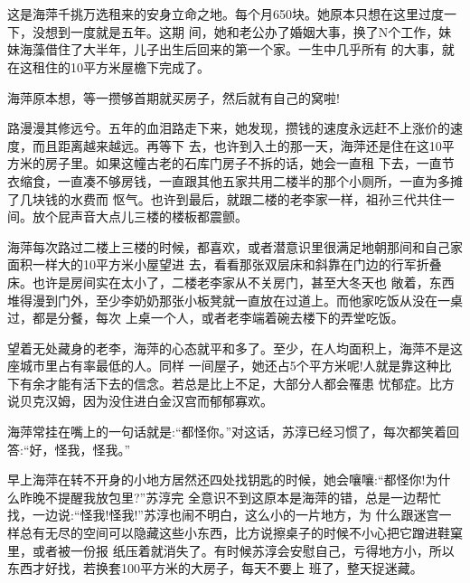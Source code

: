 \documentclass[11pt,a4paper,onecolumn]{article}
\begin{document}
\setcounter{section}{0}
\pagestyle{fancy}

\begin{center}
\end{center}

\section[\thesection]{}

这是海萍千挑万选租来的安身立命之地。每个月650块。她原本只想在这里过度一下，没想到一度就是五年。这期
间，她和老公办了婚姻大事，换了N个工作，妹妹海藻借住了大半年，儿子出生后回来的第一个家。一生中几乎所有
的大事，就在这租住的10平方米屋檐下完成了。

海萍原本想，等一攒够首期就买房子，然后就有自己的窝啦!

路漫漫其修远兮。五年的血泪路走下来，她发现，攒钱的速度永远赶不上涨价的速度，而且距离越来越远。再等下
去，也许到入土的那一天，海萍还是住在这10平方米的房子里。如果这幢古老的石库门房子不拆的话，她会一直租
下去，一直节衣缩食，一直凑不够房钱，一直跟其他五家共用二楼半的那个小厕所，一直为多摊了几块钱的水费而
怄气。也许到最后，就跟二楼的老李家一样，祖孙三代共住一间。放个屁声音大点儿三楼的楼板都震颤。

海萍每次路过二楼上三楼的时候，都喜欢，或者潜意识里很满足地朝那间和自己家面积一样大的10平方米小屋望进
去，看看那张双层床和斜靠在门边的行军折叠床。也许是房间实在太小了，二楼老李家从不关房门，甚至大冬天也
敞着，东西堆得漫到门外，至少李奶奶那张小板凳就一直放在过道上。而他家吃饭从没在一桌过，都是分餐，每次
上桌一个人，或者老李端着碗去楼下的弄堂吃饭。

望着无处藏身的老李，海萍的心态就平和多了。至少，在人均面积上，海萍不是这座城市里占有率最低的人。同样
一间屋子，她还占5个平方米呢!人就是靠这种比下有余才能有活下去的信念。若总是比上不足，大部分人都会罹患
忧郁症。比方说贝克汉姆，因为没住进白金汉宫而郁郁寡欢。

海萍常挂在嘴上的一句话就是:``都怪你。''对这话，苏淳已经习惯了，每次都笑着回答:``好，怪我，怪我。''

早上海萍在转不开身的小地方居然还四处找钥匙的时候，她会嚷嚷:``都怪你!为什么昨晚不提醒我放包里?''苏淳完
全意识不到这原本是海萍的错，总是一边帮忙找，一边说:``怪我!怪我!''苏淳也闹不明白，这么小的一片地方，为
什么跟迷宫一样总有无尽的空间可以隐藏这些小东西，比方说擦桌子的时候不小心把它蹭进鞋窠里，或者被一份报
纸压着就消失了。有时候苏淳会安慰自己，亏得地方小，所以东西才好找，若换套100平方米的大房子，每天不要上
班了，整天捉迷藏。
\end{document}

